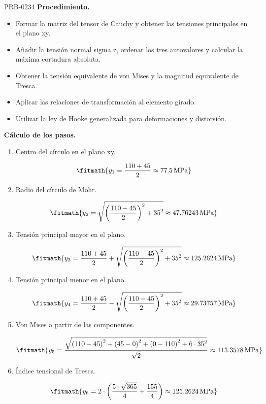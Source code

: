 \begin{studiumworked}{PRB-0234}
\textbf{Procedimiento.}\begin{itemize}\item Formar la matriz del tensor de Cauchy y obtener las tensiones principales en el plano xy.
\item Añadir la tensión normal sigma z, ordenar los tres autovalores y calcular la máxima cortadura absoluta.
\item Obtener la tensión equivalente de von Mises y la magnitud equivalente de Tresca.
\item Aplicar las relaciones de transformación al elemento girado.
\item Utilizar la ley de Hooke generalizada para deformaciones y distorsión.\end{itemize}

\textbf{Cálculo de los pasos.}

\begin{enumerate}

\item Centro del círculo en el plano xy.

\[\fitmath{y_{1}=\frac{110+45}{2}\approx 77.5\,\mathrm{MPa}}\]

\item Radio del círculo de Mohr.

\[\fitmath{y_{2}=\sqrt{{\left(\frac{110-45}{2}\right)}^{2}+{35}^{2}}\approx 47.76243\,\mathrm{MPa}}\]

\item Tensión principal mayor en el plano.

\[\fitmath{y_{3}=\frac{110+45}{2}+\sqrt{{\left(\frac{110-45}{2}\right)}^{2}+{35}^{2}}\approx 125.2624\,\mathrm{MPa}}\]

\item Tensión principal menor en el plano.

\[\fitmath{y_{4}=\frac{110+45}{2}-\sqrt{{\left(\frac{110-45}{2}\right)}^{2}+{35}^{2}}\approx 29.73757\,\mathrm{MPa}}\]

\item Von Mises a partir de las componentes.

\[\fitmath{y_{5}=\frac{\sqrt{{\left(110-45\right)}^{2}+{\left(45-0\right)}^{2}+{\left(0-110\right)}^{2}+6\cdot {35}^{2}}}{\sqrt{2}}\approx 113.3578\,\mathrm{MPa}}\]

\item Índice tensional de Tresca.

\[\fitmath{y_{6}=2\cdot \left(\frac{5\cdot \sqrt{365}}{4}+\frac{155}{4}\right)\approx 125.2624\,\mathrm{MPa}}\]


\end{enumerate}
\end{studiumworked}
